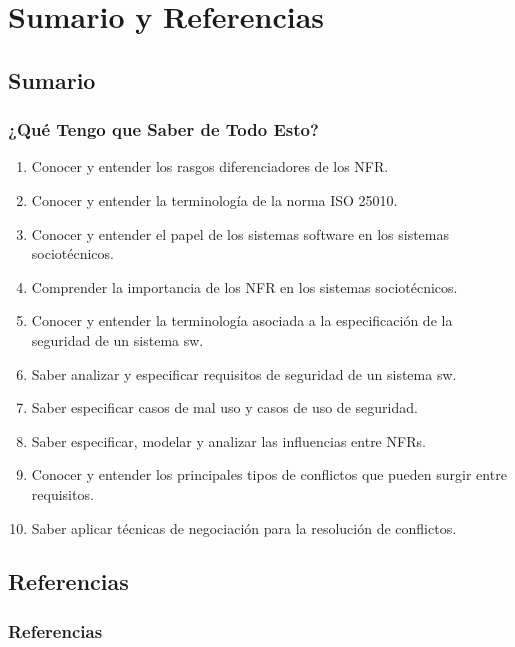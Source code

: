 \documentclass[handout,a4paper,slidestop,xcolor=pst,dvips,blue]{beamer}
\begin{document}
\section{Sumario y Referencias}

\subsection{Sumario}

\begin{frame}[c]
    \frametitle{¿Qué Tengo que Saber de Todo Esto?}
    \begin{enumerate}[<+->]
        \item Conocer y entender los rasgos diferenciadores de los NFR.
        \item Conocer y entender la terminología de la norma ISO 25010.
        \item Conocer y entender el papel de los sistemas software en los sistemas sociotécnicos.
        \item Comprender la importancia de los NFR en los sistemas sociotécnicos.
        \item Conocer y entender la terminología asociada a la especificación de la seguridad de un sistema sw.
        \item Saber analizar y especificar requisitos de seguridad de un sistema sw.
        \item Saber especificar casos de mal uso y casos de uso de seguridad.
        \item Saber especificar, modelar y analizar las influencias entre NFRs.
        \item Conocer y entender los principales tipos de conflictos que pueden surgir entre requisitos.
        \item Saber aplicar técnicas de negociación para la resolución de conflictos.
    \end{enumerate}
\end{frame}

\subsection{Referencias}

\begin{frame}
	\frametitle{Referencias}
	
	
\end{frame}
\end{document}
